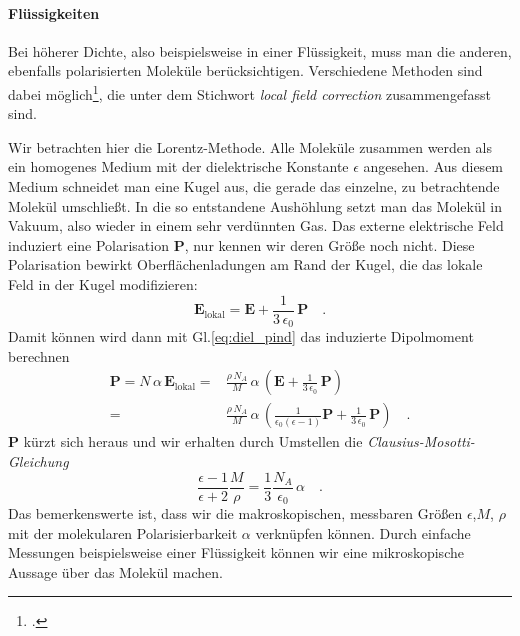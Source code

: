 \paragraph{Flüssigkeiten} Bei höherer Dichte, also beispielsweise in einer Flüssigkeit, muss man die anderen, ebenfalls polarisierten Moleküle berücksichtigen. Verschiedene Methoden sind dabei möglich\footcite{Parson}, die unter dem Stichwort \emph{local field correction} zusammengefasst sind.

Wir betrachten hier die Lorentz-Methode. Alle Moleküle zusammen werden als  ein homogenes Medium mit der  dielektrische Konstante $\epsilon$  angesehen. Aus diesem Medium schneidet man eine Kugel aus, die gerade das einzelne, zu betrachtende Molekül umschließt. In die so entstandene Aushöhlung setzt man das Molekül in Vakuum, also wieder in einem sehr verdünnten Gas. Das externe elektrische Feld induziert eine Polarisation  $\mathbf{P}$, nur kennen wir deren Größe noch nicht. Diese Polarisation bewirkt  Oberflächenladungen am Rand der Kugel, die das lokale Feld in der Kugel modifizieren:
\begin{equation}
\mathbf{E}_\text{lokal} = \mathbf{E} + \frac{1}{3 \, \epsilon_0} \, \mathbf{P} \quad . \label{eq:diel_local_field_correction}
\end{equation}
Damit können wird dann mit Gl.\ref{eq:diel_pind} das induzierte Dipolmoment berechnen
\begin{align}
 \mathbf{P} = N \, \alpha \, \mathbf{E}_\text{lokal} =&
   \frac{\rho \, N_A }{M} \, \alpha \, \left( \mathbf{E} + \frac{1}{3 \, \epsilon_0} \, \mathbf{P} \right)   \\
   =&
     \frac{\rho \, N_A }{M} \, \alpha \, \left( \frac{1}{\epsilon_0 ( \epsilon -1)}\mathbf{P} + \frac{1}{3 \, \epsilon_0} \, \mathbf{P} \right)  \quad .
\end{align}
 $\mathbf{P}$ kürzt sich heraus und wir erhalten durch Umstellen die 
\emph{Clausius-Mosotti-Gleichung}
 \begin{equation}
 \frac{\epsilon - 1}{\epsilon + 2} \frac{M}{\rho} = \frac{1}{3} \frac{N_A}{\epsilon
_0} \, \alpha \quad .\label{eq:diel_Clausius-Mosotti}
 \end{equation}
 Das bemerkenswerte ist, dass wir die makroskopischen, messbaren Größen $\epsilon$,$M$, $\rho$ mit der molekularen Polarisierbarkeit $\alpha$ verknüpfen können. Durch einfache Messungen beispielsweise einer Flüssigkeit können wir eine mikroskopische Aussage über das Molekül machen.
 
